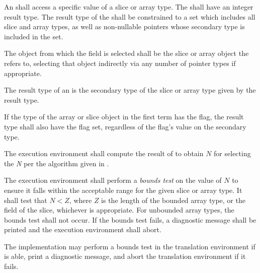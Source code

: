\specsubsubitem
An  shall access a specific value of a slice
or array type. The  shall have an integer result type.
The result type of the  shall be constrained to
a set which includes all slice and array types, as well as non-nullable pointers
whose secondary type is included in the set.


\specsubsubitem
The object from which the field is selected shall be the slice or array object
the  refers to, selecting that object indirectly
via any number of pointer types if appropriate.

\specsubsubitem
The result type of an  is the secondary type
of the slice or array type given by the  result
type.

\specsubsubitem
If the type of the array or slice object in the first term has the
 flag, the result type shall also have the 
flag set, regardless of the flag's value on the secondary type.

\specsubsubitem
The execution environment shall compute the result of
 to obtain $N$ for selecting the \textit{N} per the
algorithm given in .

\specsubsubitem
The execution environment shall perform a \textit{bounds test} on the value of
$N$ to ensure it falls within the acceptable range for the given slice or array
type. It shall test that $N < Z$, where $Z$ is the length of the bounded array
type, or the  field of the slice, whichever is appropriate.  For
unbounded array types, the bounds test shall not occur. If the bounds test
fails, a diagnostic message shall be printed and the execution environment
shall abort.

The implementation may perform a bounds test in the translation environment if
is able, print a diagnostic message, and abort the translation environment if
it fails.


\begin{grammar}
 \\
	 \terminal{[}    \terminal{]} \\
\end{grammar}

